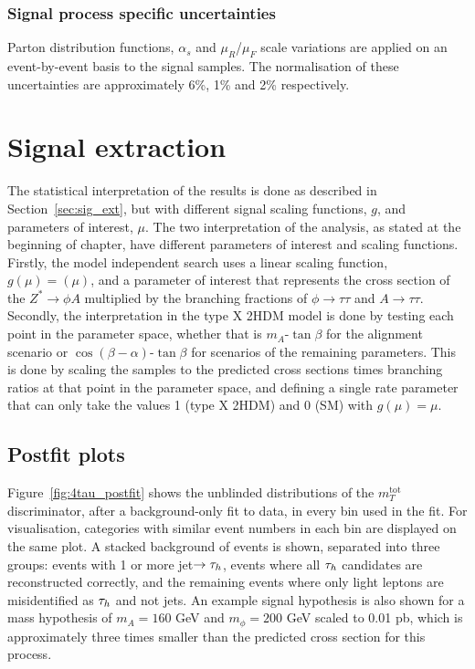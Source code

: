 \subsubsection{Signal process specific uncertainties}
Parton distribution functions, $\alpha_s$ and $\mu_{R}$/$\mu_{F}$ scale variations are applied on an event-by-event basis to the signal samples.
The normalisation of these uncertainties are approximately 6\%, 1\% and 2\% respectively.

\section{Signal extraction}

The statistical interpretation of the results is done as described in Section~\ref{sec:sig_ext}, but with different signal scaling functions, $g$, and parameters of interest, $\mu$.
The two interpretation of the analysis, as stated at the beginning of chapter, have different parameters of interest and scaling functions. \\

Firstly, the model independent search uses a linear scaling function, $g(\mu)=(\mu)$, and a parameter of interest that represents the cross section of the $Z^{*}\rightarrow \phi A$ multiplied by the branching fractions of $\phi\rightarrow\tau\tau$ and $A\rightarrow\tau\tau$.
Secondly, the interpretation in the type X \ac{2HDM} model is done by testing each point in the parameter space, whether that is $m_{A}$-$\tan\beta$ for the alignment scenario or $\cos(\beta-\alpha)$-$\tan\beta$ for scenarios of the remaining parameters. 
This is done by scaling the samples to the predicted cross sections times branching ratios at that point in the parameter space, and defining a single rate parameter that can only take the values 1 (type X \ac{2HDM}) and 0 (\ac{SM}) with $g(\mu)=\mu$.

\subsection{Postfit plots}

Figure~\ref{fig:4tau_postfit} shows the unblinded distributions of the $m_{T}^{\text{tot}}$ discriminator, after a background-only fit to data, in every bin used in the fit.
For visualisation, categories with similar event numbers in each bin are displayed on the same plot.
A stacked background of events is shown, separated into three groups: events with 1 or more jet$\rightarrow\tau_{h}$, events where all $\tau_{h}$ candidates are reconstructed correctly, and the remaining events where only light leptons are misidentified as $\tau_{h}$ and not jets.
An example signal hypothesis is also shown for a mass hypothesis of $m_A = 160$ GeV and $m_{\phi} = 200$ GeV scaled to 0.01 pb, which is approximately three times smaller than the predicted cross section for this process. \\

